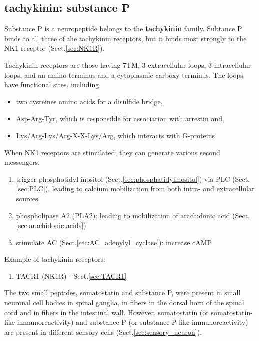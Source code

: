 \subsection{tachykinin: substance P}
\label{sec:tachykinin}
\label{sec:subtance-P}
\label{sec:tachykinin-receptor}

Substance P is a neuropeptide belongs to the {\bf tachykinin} family. 
Subtance P binds to all three of the tachykinin receptors, but it binds most
strongly to the NK1 receptor (Sect.\ref{sec:NK1R}).

Tachykinin receptors are those having 7TM, 3 extracellular loops, 3
intracellular loops, and an amino-terminus and a cytoplasmic carboxy-terminus.
The loops have functional sites, including 
\begin{itemize}
  \item two cysteines amino acids for a disulfide bridge, 
  
  \item Asp-Arg-Tyr, which is
  responsible for association with arrestin and, 
  
  \item Lys/Arg-Lys/Arg-X-X-Lys/Arg, which interacts with G-proteins
  
\end{itemize}

When NK1 receptors are stimulated, they can generate various second messengers.
\begin{enumerate}
  \item trigger phosphotidyl inositol (Sect.\ref{sec:phosphatidylinositol}) via
  PLC (Sect.\ref{sec:PLC}), leading to calcium mobilization  from both intra-
  and extracellular sources.
  
  
  \item phospholipase A2 (PLA2): leading to mobilization of arachidonic acid
  (Sect.\ref{sec:arachidonic-acids})
  
  \item stimulate AC (Sect.\ref{sec:AC_adenylyl_cyclase}): increase cAMP
\end{enumerate}

Example of tachykinin receptors:
\begin{enumerate}
  \item TACR1 (NK1R) - Sect.\ref{sec:TACR1}
\end{enumerate}

The two small peptides, somatostatin and substance P, were present in small
neuronal cell bodies in spinal ganglia, in fibers in the dorsal horn of the
spinal cord and in fibers in the intestinal wall.
However, somatostatin (or somatostatin-like immunoreactivity) and substance P
(or substance P-like immunoreactivity) are present in different sensory cells
(Sect.\ref{sec:sensory_neuron}).

